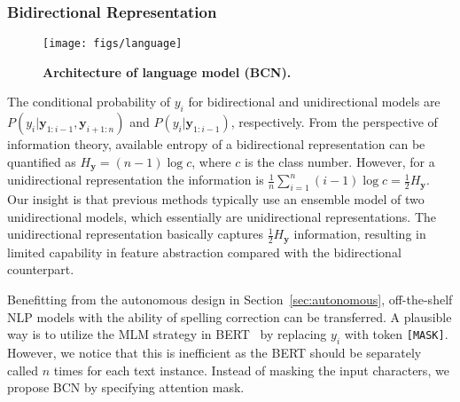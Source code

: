 \documentclass[10pt,journal,compsoc]{IEEEtran}
\begin{document}
\subsubsection{Bidirectional Representation}

\begin{figure}
   \begin{center}
      \texttt{[image: figs/language]}
      \caption{\textbf{Architecture of language model (BCN).}}
      \label{fig:label}
   \end{center}
   \vspace{-2em}   
\end{figure}

The conditional probability of $y_i$ for bidirectional and unidirectional models are $P(y_i|\bm{y}_{1:{i-1}},\bm{y}_{{i+1}:n})$ and $P(y_i|\bm{y}_{1:{i-1}})$, respectively. From the perspective of information theory, available entropy of a bidirectional representation can be quantified as $H_{\bm{y}} = (n-1)\log{c}$, where $c$ is the class number. However, for a unidirectional representation the information is $\frac{1}{n}\sum^n_{i=1}{(i-1)\log{c}}=\frac{1}{2}H_{\bm{y}}$. Our insight is that previous methods typically use an ensemble model of two unidirectional models, which essentially are unidirectional representations. The unidirectional representation basically captures $\frac{1}{2}H_{\bm{y}}$ information, resulting in limited capability in feature abstraction compared with the bidirectional counterpart.


Benefitting from the autonomous design in Section~\ref{sec:autonomous}, off-the-shelf NLP models with the ability of spelling correction can be transferred. A plausible way is to utilize the MLM strategy in BERT~\cite{devlin2018bert} by replacing $y_i$ with token {\tt{[MASK]}}. However, we notice that this is inefficient as the BERT should be separately called $n$ times for each text instance. Instead of masking the input characters, we propose BCN by specifying attention mask.
\end{document}
